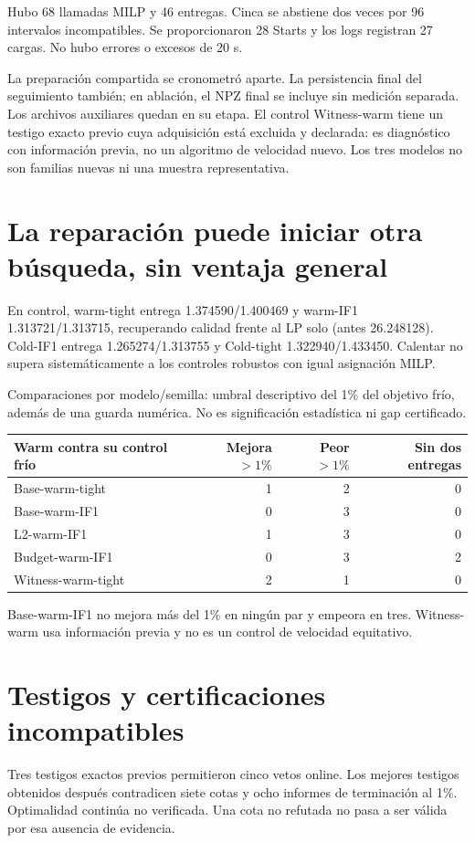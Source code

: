 \documentclass[10pt,a4paper]{article}
\begin{document}
Hubo 68 llamadas MILP y 46
entregas. Cinca se abstiene dos veces por 96 intervalos incompatibles. Se
proporcionaron 28 Starts y los logs registran
27 cargas. No hubo errores o excesos de 20 s.

La preparación compartida se cronometró aparte. La persistencia final del
seguimiento también; en ablación, el NPZ final se incluye sin medición separada.
Los archivos auxiliares quedan en su etapa. El control Witness-warm tiene un
testigo exacto previo cuya adquisición está excluida y declarada: es diagnóstico
con información previa, no un algoritmo de velocidad nuevo. Los tres modelos
no son familias nuevas ni una muestra representativa.
\newpage
\section*{La reparación puede iniciar otra búsqueda, sin ventaja general}
En control, warm-tight entrega 1.374590/1.400469 y warm-IF1 1.313721/1.313715,
recuperando calidad frente al LP solo (antes 26.248128). Cold-IF1 entrega
1.265274/1.313755 y Cold-tight 1.322940/1.433450. Calentar no supera
sistemáticamente a los controles robustos con igual asignación MILP.

Comparaciones por modelo/semilla: umbral descriptivo del 1\% del objetivo frío,
además de una guarda numérica. No es significación estadística ni gap certificado.
\begin{center}\small\begin{tabular}{@{}lrrr@{}}\toprule
Warm contra su control frío & Mejora $>1\%$ & Peor $>1\%$ & Sin dos entregas\\\midrule
Base-warm-tight & 1 & 2 & 0\\
Base-warm-IF1 & 0 & 3 & 0\\
L2-warm-IF1 & 1 & 3 & 0\\
Budget-warm-IF1 & 0 & 3 & 2\\
Witness-warm-tight & 2 & 1 & 0\\
\bottomrule\end{tabular}\end{center}
Base-warm-IF1 no mejora más del 1\% en ningún par y empeora en tres.
Witness-warm usa información previa y no es un control de velocidad equitativo.
\section*{Testigos y certificaciones incompatibles}
Tres testigos exactos previos permitieron cinco vetos online. Los mejores
testigos obtenidos después contradicen siete cotas y ocho informes de
terminación al 1\%. Optimalidad continúa no verificada. Una cota no refutada
no pasa a ser válida por esa ausencia de evidencia.
\end{document}
